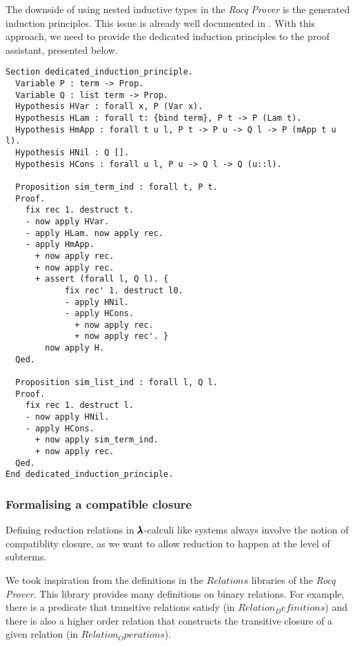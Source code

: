 
The downside of using nested inductive types in the \textit{Rocq Prover} is the generated induction principles.
This issue is already well documented in \cite[Chapter~14.3]{CoqArt}.
With this approach, we need to provide the dedicated induction principles to the proof assistant, presented below.

\begin{lstlisting}[language=Coq]
Section dedicated_induction_principle.
  Variable P : term -> Prop.
  Variable Q : list term -> Prop.
  Hypothesis HVar : forall x, P (Var x).
  Hypothesis HLam : forall t: {bind term}, P t -> P (Lam t).
  Hypothesis HmApp : forall t u l, P t -> P u -> Q l -> P (mApp t u l).
  Hypothesis HNil : Q [].
  Hypothesis HCons : forall u l, P u -> Q l -> Q (u::l).
  
  Proposition sim_term_ind : forall t, P t.
  Proof.
    fix rec 1. destruct t.
    - now apply HVar.
    - apply HLam. now apply rec.
    - apply HmApp.
      + now apply rec.
      + now apply rec.
      + assert (forall l, Q l). {
            fix rec' 1. destruct l0.
            - apply HNil.
            - apply HCons.
              + now apply rec.
              + now apply rec'. }          
        now apply H.
  Qed.      
  
  Proposition sim_list_ind : forall l, Q l.
  Proof.
    fix rec 1. destruct l.
    - now apply HNil.
    - apply HCons.
      + now apply sim_term_ind.
      + now apply rec.
  Qed.          
End dedicated_induction_principle.
\end{lstlisting}

\subsubsection{Formalising a compatible closure}

Defining reduction relations in $\pmb{\lambda}$-calculi like systems always involve the notion of compatiblity closure, as we want to allow reduction to happen at the level of subterms.

We took inspiration from the definitions in the \lst$Relations$ libraries of the \textit{Rocq Prover}.
This library provides many definitions on binary relations.
For example, there is a predicate that transitive relations satisfy (in \lst$Relation_Definitions$) and there is also a higher order relation that constructs the transitive closure of a given relation (in \lst$Relation_Operations$).

